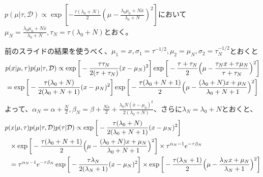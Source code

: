 \documentclass[aspectratio=169,unicode,dvipdfmx,14pt]{beamer}
\begin{document}
\begin{frame}
\FontMath
$p(\mu|\tau,\mathcal{D}) \propto \exp [ - \frac{\tau( \lambda_0 + N )}{2}  ( \mu - \frac{ \lambda_0 \mu_0 + N\bar{x} }{ \lambda_0 + N } )^2 ]$において$\mu_N = \frac{ \lambda_0 \mu_0 + N\bar{x} }{ \lambda_0 + N }, \tau_N = \tau(\lambda_0 + N)$とおく。

前のスライドの結果を使うべく、$\mu_1 = x, \sigma_1 = \tau^{-1/2}, \mu_2 = \mu_N, \sigma_2 = \tau_N^{-1/2}$とおくと
\begin{align}
& p(x|\mu,\tau) p(\mu|\tau,\mathcal{D})
\propto
\exp\bigg[ - \frac{ \tau\tau_N }{2(\tau + \tau_N)} (x - \mu_N)^2 \bigg]
\exp\bigg[ - \frac{ \tau + \tau_N }{2} \Big(\mu - \frac{ \tau_N x + \tau \mu_N }{ \tau + \tau_N }\Big)^2 \bigg]
\notag \\ & =
\exp\bigg[ - \frac{ \tau( \lambda_0 + N ) }{2(\lambda_0 + N + 1)} (x - \mu_N)^2 \bigg]
\exp\bigg[ - \frac{ \tau( \lambda_0 + N + 1 ) }{2} \Big(\mu - \frac{ ( \lambda_0 + N ) x + \mu_N }{ \lambda_0 + N + 1 }\Big)^2 \bigg]
\end{align}
よって、$\alpha_N=\alpha+\frac{N}{2}, \beta_N = \beta + \frac{Ns}{2} + \frac{ \lambda_0 N (\bar{x} - \mu_0)^2 }{ 2( \lambda_0 + N ) }$、さらに$\lambda_N = \lambda_0 + N$とおくと、
\begin{align}
& p(x|\mu,\tau) p(\mu|\tau,\mathcal{D})p(\tau|\mathcal{D})
\propto
\exp\bigg[ - \frac{ \tau( \lambda_0 + N ) }{2(\lambda_0 + N + 1)} (x - \mu_N)^2 \bigg]
\notag \\ & \mbox{ \ } \times
\exp\bigg[ - \frac{ \tau( \lambda_0 + N + 1 ) }{2} \Big(\mu - \frac{ ( \lambda_0 + N ) x + \mu_N }{ \lambda_0 + N + 1 }\Big)^2 \bigg] \times
\tau^{\alpha_N - 1} e^{ - \tau \beta_N }
\notag \\ & \mbox{ \ } = \tau^{\alpha_N - 1} e^{ - \tau \beta_N }
\exp\bigg[ - \frac{ \tau \lambda_N }{2(\lambda_N + 1)} (x - \mu_N)^2 \bigg]
\times \exp\bigg[ - \frac{ \tau( \lambda_N + 1 ) }{2} \Big(\mu - \frac{ \lambda_N x + \mu_N }{ \lambda_N + 1 }\Big)^2 \bigg]
\end{align}
\end{frame}
\end{document}
